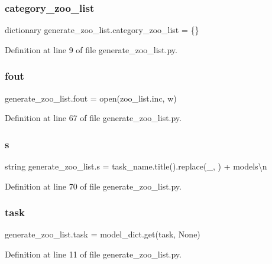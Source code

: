 \subsubsection{\texorpdfstring{category\+\_\+zoo\+\_\+list}{category\_zoo\_list}}
{\footnotesize\ttfamily dictionary generate\+\_\+zoo\+\_\+list.\+category\+\_\+zoo\+\_\+list = \{\}}



Definition at line 9 of file generate\+\_\+zoo\+\_\+list.\+py.

\mbox{\label{namespacegenerate__zoo__list_a856ce3399906c5da79bdf26a784249ae}} 
\subsubsection{\texorpdfstring{fout}{fout}}
{\footnotesize\ttfamily generate\+\_\+zoo\+\_\+list.\+fout = open(\textquotesingle{}zoo\+\_\+list.\+inc\textquotesingle{}, \textquotesingle{}w\textquotesingle{})}



Definition at line 67 of file generate\+\_\+zoo\+\_\+list.\+py.

\mbox{\label{namespacegenerate__zoo__list_ab242661624dc2add618658bc9873f621}} 
\subsubsection{\texorpdfstring{s}{s}}
{\footnotesize\ttfamily string generate\+\_\+zoo\+\_\+list.\+s = task\+\_\+name.\+title().replace(\textquotesingle{}\+\_\+\textquotesingle{}, \textquotesingle{} \textquotesingle{}) + \textquotesingle{} models\textbackslash{}n\textquotesingle{}}



Definition at line 70 of file generate\+\_\+zoo\+\_\+list.\+py.

\mbox{\label{namespacegenerate__zoo__list_ad3dbd35f1d59cff673fdcbc18b300da2}} 
\subsubsection{\texorpdfstring{task}{task}}
{\footnotesize\ttfamily generate\+\_\+zoo\+\_\+list.\+task = model\+\_\+dict.\+get(\textquotesingle{}task\textquotesingle{}, None)}



Definition at line 11 of file generate\+\_\+zoo\+\_\+list.\+py.

